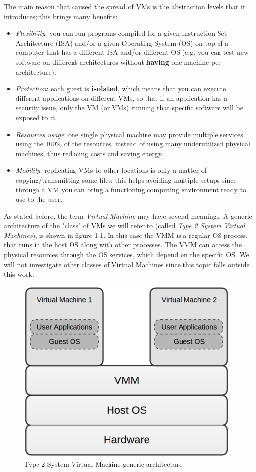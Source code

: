 \documentclass[a4paper, 12pt, titlepage]{report}
\begin{document}
The main reason that caused the spread of VMs is the abstraction levels that it introduces; this brings many benefits:
\begin{itemize}
\item \textit{Flexibility}: you can run programs compiled for a given Instruction Set Architecture (ISA) and/or a given Operating System (OS) on top of a computer that has a different ISA and/or different OS (e.g. you can test new software on different architectures without \textbf{having} one machine per architecture).
\item \textit{Protection}: each guest is \textbf{isolated}, which means that you can execute different applications on different VMs, so that if an application has a security issue, only the VM (or VMs) running that specific software will be exposed to it.
\item \textit{Resources usage}: one single physical machine may provide multiple services using the 100\% of the resources, instead of using many underutilized physical machines, thus reducing costs and saving energy.
\item \textit{Mobility}: replicating VMs to other locations is only a matter of copying/transmitting some files; this helps avoiding multiple setups since through a VM you can bring a functioning computing environment ready to use to the user.
\end{itemize}

As stated before, the term \textit{Virtual Machine} may have several meanings. A generic architecture of the "class" of VMs we will refer to (called \textit{Type 2 System Virtual Machines}), is shown in figure 1.1. In this case the VMM is a regular OS process, that runs in the host OS along with other processes. The VMM can access the physical resources through the OS services, which depend on the specific OS. We will not investigate other classes of Virtual Machines since this topic falls outside this work. 
\begin{figure}[!h]
	\centering
	\includegraphics[scale=0.5]{img/vm_arch.png}
	\caption{Type 2 System Virtual Machine generic architecture}
\end{figure}
\end{document}
